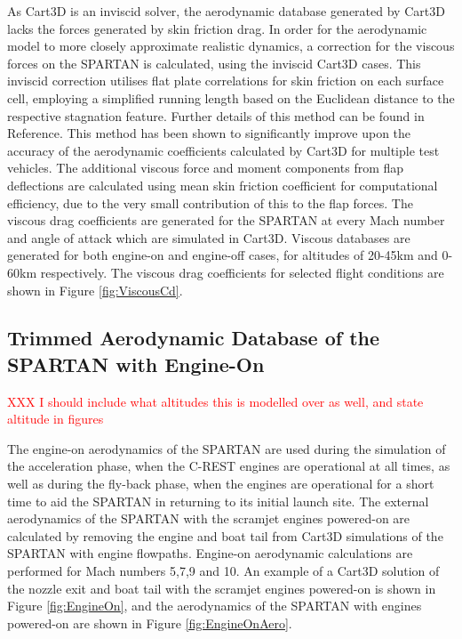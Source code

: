 		As Cart3D is an inviscid solver, the aerodynamic database generated by Cart3D lacks the forces generated by skin friction drag. In order for the aerodynamic model to more closely approximate realistic dynamics, a correction for the viscous forces on the SPARTAN is calculated, using the inviscid Cart3D cases. This inviscid correction utilises flat plate correlations for skin friction on each surface cell, employing a simplified running length based on the Euclidean distance to the respective stagnation feature. Further details of this method can be found in Reference\cite{Ward2018}. This method has been shown to significantly improve upon the accuracy of the aerodynamic coefficients calculated by Cart3D for multiple test vehicles\cite{Ward2018}. The additional viscous force and moment components from flap deflections are calculated using mean skin friction coefficient for computational efficiency, due to the very small contribution of this to the flap forces. The viscous drag coefficients are generated for the SPARTAN at every Mach number and angle of attack which are simulated in Cart3D. Viscous databases are generated for both engine-on and engine-off cases, for altitudes of 20-45km and 0-60km respectively.  The viscous drag coefficients for selected flight conditions are shown in Figure \ref{fig:ViscousCd}.
		
		
		
		
		
		\subsection{Trimmed Aerodynamic Database of the SPARTAN with Engine-On}\label{sec:trimmedongineon}
		\textcolor{red}{XXX I should include what altitudes this is modelled over as well, and state altitude in figures}
		
		The engine-on aerodynamics of the SPARTAN are used during the simulation of the acceleration phase, when the C-REST engines are operational at all times, as well as during the fly-back phase, when the engines are operational for a short time to aid the SPARTAN in returning to its initial launch site.
		The external aerodynamics of the SPARTAN with the scramjet engines powered-on are calculated by removing the engine and boat tail from Cart3D simulations of the SPARTAN with engine flowpaths. Engine-on aerodynamic calculations are performed for Mach numbers 5,7,9 and 10. An example of a Cart3D solution of the nozzle exit and boat tail with the scramjet engines powered-on is shown in Figure \ref{fig:EngineOn}, and the aerodynamics of the SPARTAN with engines powered-on are shown in Figure \ref{fig:EngineOnAero}.
		
